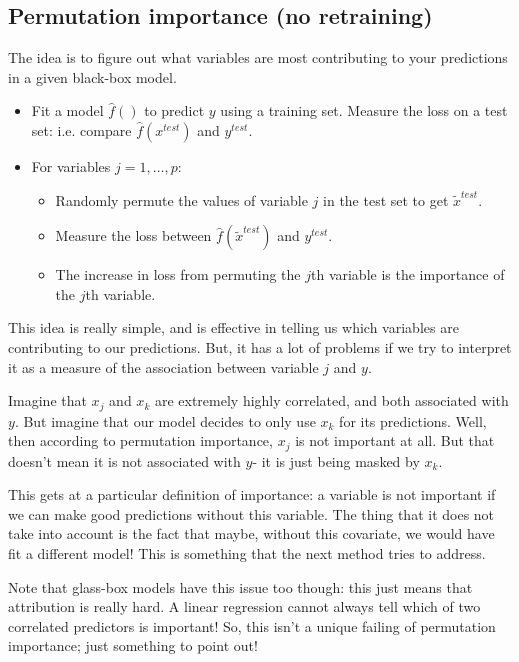 \subsection{Permutation importance (no retraining)}

The idea is to figure out what variables are most contributing to your predictions in a given black-box model.

\begin{itemize}
\item Fit a model $\hat{f}()$ to predict $y$ using a training set. Measure the loss on a test set: i.e. compare $\hat{f}(x^{test})$ and $y^{test}$.
\item For variables $j=1,\ldots,p$:
\begin{itemize}
\item Randomly permute the values of variable $j$ in the test set to get $\tilde{x}^{test}$.
\item Measure the loss between $\hat{f}(\tilde{x}^{test})$ and $y^{test}$. 
\item The increase in loss from permuting the $j$th variable is the importance of the $j$th variable. 
\end{itemize}
\end{itemize}

This idea is really simple, and is effective in telling us which variables are contributing to our predictions. But, it has a lot of problems if we try to interpret it as a measure of the association between variable $j$ and $y$.

Imagine that $x_j$ and $x_k$ are extremely highly correlated, and both associated with $y$. But imagine that our model decides to only use $x_k$ for its predictions. Well, then according to permutation importance, $x_j$ is not important at all. But that doesn't mean it is not associated with $y$- it is just being masked by $x_k$. 

This gets at a particular definition of importance: a variable is not important if we can make good predictions without this variable. The thing that it does not take into account is the fact that maybe, without this covariate, we would have fit a different model! This is something that the next method tries to address. 

Note that glass-box models have this issue too though: this just means that attribution is really hard. A linear regression cannot always tell which of two correlated predictors is important! So, this isn't a unique failing of permutation importance; just something to point out!

